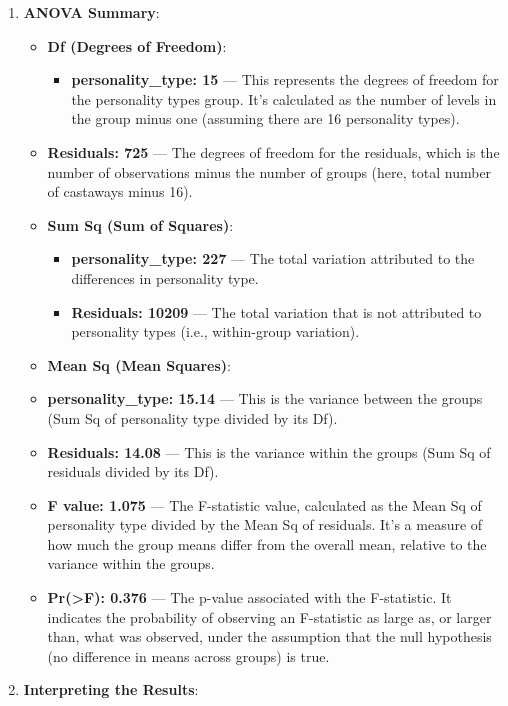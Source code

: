 \documentclass[
]{book}
\providecommand{\tightlist}{%
  \setlength{\itemsep}{0pt}\setlength{\parskip}{0pt}}
\begin{document}
\begin{enumerate}
\def\labelenumi{\arabic{enumi}.}
\tightlist
\item
  \textbf{ANOVA Summary}:

  \begin{itemize}
  \tightlist
  \item
    \textbf{Df (Degrees of Freedom)}:

    \begin{itemize}
    \tightlist
    \item
      \textbf{personality\_type: 15} --- This represents the degrees of freedom for the personality types group. It's calculated as the number of levels in the group minus one (assuming there are 16 personality types).
    \end{itemize}
  \item
    \textbf{Residuals: 725} --- The degrees of freedom for the residuals, which is the number of observations minus the number of groups (here, total number of castaways minus 16).
  \item
    \textbf{Sum Sq (Sum of Squares)}:

    \begin{itemize}
    \tightlist
    \item
      \textbf{personality\_type: 227} --- The total variation attributed to the differences in personality type.
    \item
      \textbf{Residuals: 10209} --- The total variation that is not attributed to personality types (i.e., within-group variation).
    \end{itemize}
  \item
    \textbf{Mean Sq (Mean Squares)}:
  \item
    \textbf{personality\_type: 15.14} --- This is the variance between the groups (Sum Sq of personality type divided by its Df).
  \item
    \textbf{Residuals: 14.08} --- This is the variance within the groups (Sum Sq of residuals divided by its Df).
  \item
    \textbf{F value: 1.075} --- The F-statistic value, calculated as the Mean Sq of personality type divided by the Mean Sq of residuals. It's a measure of how much the group means differ from the overall mean, relative to the variance within the groups.
  \item
    \textbf{Pr(\textgreater F): 0.376} --- The p-value associated with the F-statistic. It indicates the probability of observing an F-statistic as large as, or larger than, what was observed, under the assumption that the null hypothesis (no difference in means across groups) is true.
  \end{itemize}
\item
  \textbf{Interpreting the Results}:


\end{enumerate}
\end{document}
